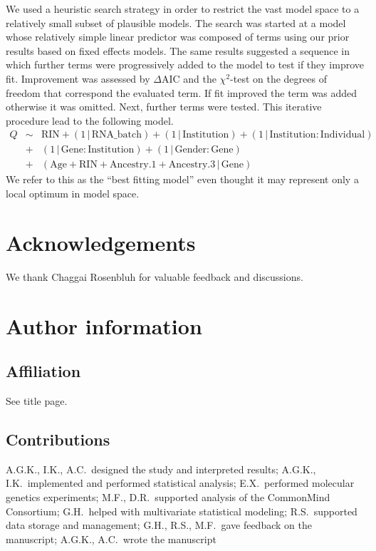 \documentclass[letterpaper]{article}
\begin{document}
We used a heuristic search strategy in order to restrict
the vast model space to a relatively small subset of plausible models.  The
search was started at a model whose relatively simple linear predictor was composed of terms
using our prior results based on fixed effects models.  The same results
suggested a sequence in which further terms were progressively added to the
model to test if they improve fit.  Improvement was assessed by \(\Delta
\mathrm{AIC}\) and the \(\chi^2\)-test on the degrees of freedom that
correspond the evaluated term.  If fit improved the term was added otherwise
it was omitted.  Next, further terms were tested.  This iterative procedure
lead to the following model.
\begin{eqnarray*}
Q &\sim&
\mathrm{RIN} + (1 \,|\, \mathrm{RNA\_batch}) + (1 \,|\, \mathrm{Institution}) + (1 \,|\,
\mathrm{Institution}:\mathrm{Individual}) \\
&+& (1 \,|\, \mathrm{Gene}:\mathrm{Institution}) + (1 \,|\, \mathrm{Gender}:\mathrm{Gene}) \\
&+& (\mathrm{Age} + \mathrm{RIN} + \mathrm{Ancestry.1} + \mathrm{Ancestry.3} \,|\, \mathrm{Gene})
\end{eqnarray*}
We refer to this as the ``best
fitting model'' even thought it may represent only a local optimum in model
space.

\clearpage


\clearpage
\section{Acknowledgements}

We thank Chaggai Rosenbluh for valuable feedback and discussions.

\clearpage
\section{Author information}

\subsection{Affiliation}

See title page.

\subsection{Contributions}

A.G.K., I.K., A.C.~designed the study and interpreted results;  A.G.K., I.K.~implemented and performed statistical analysis; E.X.~performed molecular
genetics experiments; M.F., D.R.~supported analysis of the CommonMind
Consortium; G.H.~helped with multivariate statistical modeling; R.S.~supported
data storage and management; G.H., R.S., M.F.~gave feedback on the manuscript;
A.G.K., A.C.~wrote the manuscript
\end{document}
